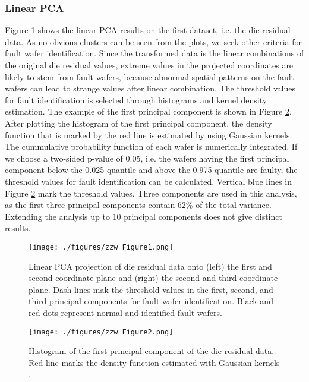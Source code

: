 \documentclass[english]{article}
\numberwithin{equation}{section}
\numberwithin{table}{section}
\numberwithin{figure}{section}
\begin{document}
\subsubsection{Linear PCA}
\hspace{12 pt}
Figure \ref{fig:1} shows the linear PCA results on the first dataset,
i.e. the die residual data. As no obvious clusters can be seen from
the plots, we seek other criteria for fault wafer identification.
Since the transformed data is the linear combinations of the original
die residual values, extreme values in the projected coordinates are
likely to stem from fault wafers, because abnormal spatial patterns
on the fault wafers can lead to strange values after linear combination.
The threshold values for fault identification is selected through
histograms and kernel density estimation. The example of the first
principal component is shown in Figure \ref{fig:2}. After plotting
the histogram of the first principal component, the density function
that is marked by the red line is estimated by using Gaussian kernels.
The cummulative probability function of each wafer is numerically
integrated. If we choose a two-sided p-value of 0.05, i.e. the wafers
having the first principal component below the 0.025 quantile and
above the 0.975 quantile are faulty, the threshold values for fault
identification can be calculated. Vertical blue lines in Figure \ref{fig:2}
mark the threshold values. Three components are used in this analysis,
as the first three principal components contain 62\% of the total
variance. Extending the analysis up to 10 principal components does
not give distinct results.

\begin{figure}[!tph]
\begin{centering}
\texttt{[image: ./figures/zzw\_Figure1.png]}
\par\end{centering}

\caption{Linear PCA projection of die residual data onto (left) the first and
second coordinate plane and (right) the second and third coordinate
plane. Dash lines mak the threshold values in the first, second, and
third principal components for fault wafer identification. Black and
red dots represent normal and identified fault wafers.\label{fig:1}}
\end{figure}


\begin{figure}[!tph]
\begin{centering}
\texttt{[image: ./figures/zzw\_Figure2.png]}
\par\end{centering}

\caption{Histogram of the first principal component of the die residual data.
Red line marks the density function estimated with Gaussian kernels
. \label{fig:2}}

\end{figure}
\end{document}

